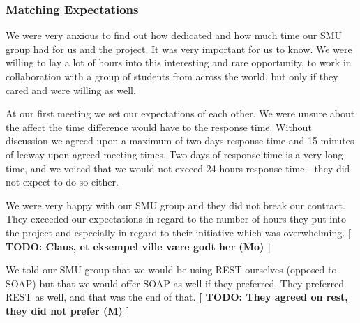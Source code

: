 \subsubsection{Matching Expectations}
We were very anxious to find out how dedicated and how much time our SMU group had for us and the project. It was very important for us to know. We were willing to lay a lot of hours into this interesting and rare opportunity, to work in collaboration with a group of students from across the world, but only if they cared and were willing as well.

At our first meeting we set our expectations of each other. We were unsure about the affect the time difference would have to the response time. Without discussion we agreed upon a maximum of two days response time and 15 minutes of leeway upon agreed meeting times. Two days of response time is a very long time, and we voiced that we would not exceed 24 hours response time - they did not expect to do so either.

We were very happy with our SMU group and they did not break our contract. They exceeded our expectations in regard to the number of hours they put into the project and especially in regard to their initiative which was overwhelming. \textbf{[ TODO: Claus, et eksempel ville være godt her (Mo) ]}

We told our SMU group that we would be using REST ourselves (opposed to SOAP) but that we would offer SOAP as well if they preferred. They preferred REST as well, and that was the end of that. \textbf{[ TODO: They agreed on rest, they did not prefer (M) ]}